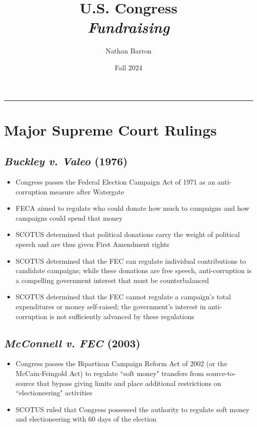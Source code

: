 \documentclass[10pt]{article}
\title{\textbf{U.S. Congress}\\\textit{Fundraising}}
\author{Nathan Barron}
\date{Fall 2024}
\begin{document}
	\maketitle
	\tableofcontents
	\vspace{.25in}
	\hrule
	\vspace{.25in}
	
	
	\section{Major Supreme Court Rulings}
	
	\subsection{\textit{Buckley v. Valeo} (1976)}
	\begin{itemize}
		\item Congress passes the Federal Election Campaign Act of 1971 as an anti-corruption measure after Watergate
		\item FECA aimed to regulate who could donate how much to campaigns and how campaigns could spend that money
		\item SCOTUS determined that political donations carry the weight of political speech and are thus given First Amendment rights
		\item SCOTUS determined that the FEC can regulate individual contributions to candidate campaigns; while these donations are free speech, anti-corruption is a compelling government interest that must be counterbalanced
		\item SCOTUS determined that the FEC cannot regulate a campaign's total expenditures or money self-raised; the government's interest in anti-corruption is not sufficiently advanced by these regulations
	\end{itemize}
	
	\subsection{\textit{McConnell v. FEC} (2003)}
	\begin{itemize}
		\item Congress passes the Bipartisan Campaign Reform Act of 2002 (or the McCain-Feingold Act) to regulate ``soft money" transfers from source-to-source that bypass giving limits and place additional restrictions on ``electioneering" activities
		\item SCOTUS ruled that Congress possessed the authority to regulate soft money and electioneering with 60 days of the election
	\end{itemize}
	
\end{document}
